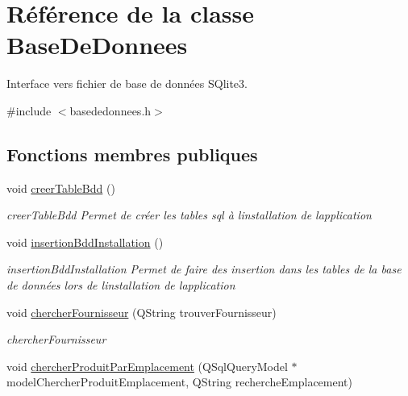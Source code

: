 \hypertarget{class_base_de_donnees}{}\section{Référence de la classe Base\+De\+Donnees}
\label{class_base_de_donnees}


Interface vers fichier de base de données S\+Qlite3.  




{\ttfamily \#include $<$basededonnees.\+h$>$}

\subsection*{Fonctions membres publiques}
\begin{DoxyCompactItemize}
\item 
\mbox{\label{class_base_de_donnees_a888c0084f35395cc2aaae8326a27af06}} 
void \mbox{\hyperlink{class_base_de_donnees_a888c0084f35395cc2aaae8326a27af06}{creer\+Table\+Bdd}} ()
\begin{DoxyCompactList}\small\item\em creer\+Table\+Bdd Permet de créer les tables sql à l\textquotesingle{}installation de l\textquotesingle{}application \end{DoxyCompactList}\item 
\mbox{\label{class_base_de_donnees_a635a8df387997ad54a4bcc4b8bce1a78}} 
void \mbox{\hyperlink{class_base_de_donnees_a635a8df387997ad54a4bcc4b8bce1a78}{insertion\+Bdd\+Installation}} ()
\begin{DoxyCompactList}\small\item\em insertion\+Bdd\+Installation Permet de faire des insertion dans les tables de la base de données lors de l\textquotesingle{}installation de l\textquotesingle{}application \end{DoxyCompactList}\item 
void \mbox{\hyperlink{class_base_de_donnees_aaff06392cdd1aa3e3e66f1bb8214d1fb}{chercher\+Fournisseur}} (Q\+String trouver\+Fournisseur)
\begin{DoxyCompactList}\small\item\em chercher\+Fournisseur \end{DoxyCompactList}\item 
void \mbox{\hyperlink{class_base_de_donnees_a7741ad517714e619d7f8a0f202d3b38d}{chercher\+Produit\+Par\+Emplacement}} (Q\+Sql\+Query\+Model $\ast$model\+Chercher\+Produit\+Emplacement, Q\+String recherche\+Emplacement)

\end{DoxyCompactItemize}
